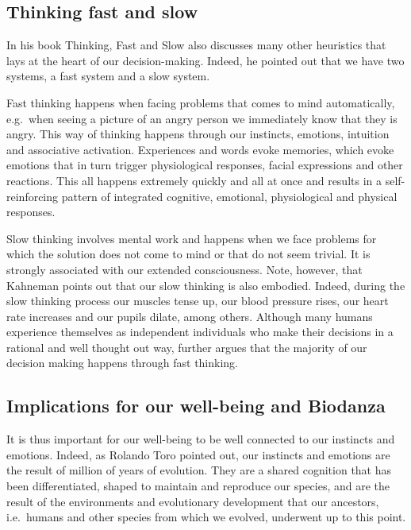\documentclass[
  11pt,
]{book}
\begin{document}
\hypertarget{thinking-fast-and-slow}{%
\subsection{Thinking fast and slow}\label{thinking-fast-and-slow}}

In his book Thinking, Fast and Slow \citet{Kahneman2012} also discusses many other heuristics that lays at the heart of our decision-making. Indeed, he pointed out that we have two systems, a fast system and a slow system.

Fast thinking happens when facing problems that comes to mind automatically, e.g.~when seeing a picture of an angry person we immediately know that they is angry. This way of thinking happens through our instincts, emotions, intuition and associative activation. Experiences and words evoke memories, which evoke emotions that in turn trigger physiological responses, facial expressions and other reactions. This all happens extremely quickly and all at once and results in a self-reinforcing pattern of integrated cognitive, emotional, physiological and physical responses.

Slow thinking involves mental work and happens when we face problems for which the solution does not come to mind or that do not seem trivial. It is strongly associated with our extended consciousness. Note, however, that Kahneman points out that our slow thinking is also embodied. Indeed, during the slow thinking process our muscles tense up, our blood pressure rises, our heart rate increases and our pupils dilate, among others. Although many humans experience themselves as independent individuals who make their decisions in a rational and well thought out way, \citet{Kahneman2012} further argues that the majority of our decision making happens through fast thinking.

\hypertarget{implications-for-our-well-being-and-biodanza}{%
\subsection{Implications for our well-being and Biodanza}\label{implications-for-our-well-being-and-biodanza}}

It is thus important for our well-being to be well connected to our instincts and emotions. Indeed, as Rolando Toro pointed out, our instincts and emotions are the result of million of years of evolution. They are a shared cognition that has been differentiated, shaped to maintain and reproduce our species, and are the result of the environments and evolutionary development that our ancestors, i.e.~humans and other species from which we evolved, underwent up to this point.
\end{document}
